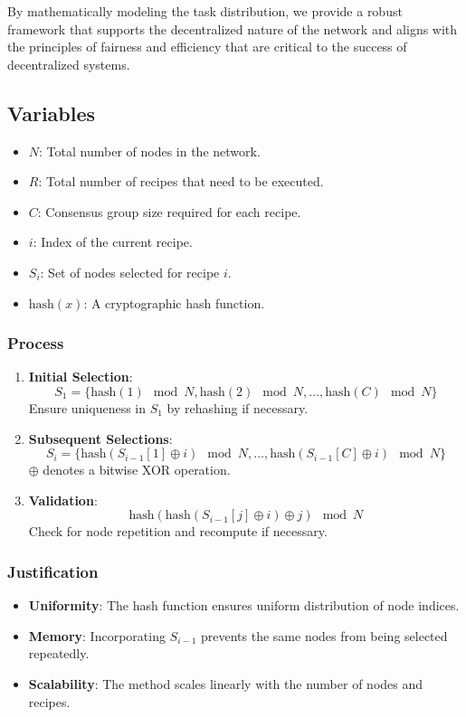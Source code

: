 \documentclass[11pt]{article}
\begin{document}
By mathematically modeling the task distribution, we provide a robust framework that supports the decentralized nature of the network and aligns with the principles of fairness and efficiency that are critical to the success of decentralized systems.

\subsection*{Variables}
\begin{itemize}
    \item \( N \): Total number of nodes in the network.
    \item \( R \): Total number of recipes that need to be executed.
    \item \( C \): Consensus group size required for each recipe.
    \item \( i \): Index of the current recipe.
    \item \( S_i \): Set of nodes selected for recipe \( i \).
    \item \( \text{hash}(x) \): A cryptographic hash function.
\end{itemize}

\subsubsection*{Process}
\begin{enumerate}
    \item \textbf{Initial Selection}:
    \[
    S_1 = \{ \text{hash}(1) \mod N, \text{hash}(2) \mod N, \ldots, \text{hash}(C) \mod N \}
    \]
    Ensure uniqueness in \( S_1 \) by rehashing if necessary.

    \item \textbf{Subsequent Selections}:
    \[
    S_i = \{ \text{hash}(S_{i-1}[1] \oplus i) \mod N, \ldots, \text{hash}(S_{i-1}[C] \oplus i) \mod N \}
    \]
    \( \oplus \) denotes a bitwise XOR operation.

    \item \textbf{Validation}:
    \[
    \text{hash}(\text{hash}(S_{i-1}[j] \oplus i) \oplus j) \mod N
    \]
    Check for node repetition and recompute if necessary.
\end{enumerate}

\subsubsection*{Justification}
\begin{itemize}
    \item \textbf{Uniformity}: The hash function ensures uniform distribution of node indices.
    \item \textbf{Memory}: Incorporating \( S_{i-1} \) prevents the same nodes from being selected repeatedly.
    \item \textbf{Scalability}: The method scales linearly with the number of nodes and recipes.
\end{itemize}
\end{document}
